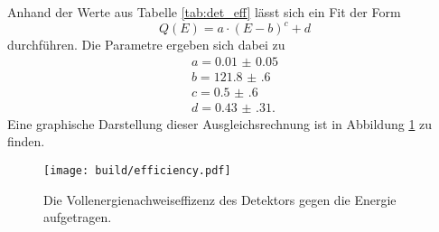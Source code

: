 Anhand der Werte aus Tabelle \ref{tab:det_eff} lässt sich ein Fit der Form
\begin{equation}
  Q(E) = a \cdot \left(E-b \right)^c + d
\end{equation}
durchführen. Die Parametre ergeben sich dabei zu
\begin{gather}
  a = \num{0.01(5)} \\
  b = \num{121.8(6)} \\
  c = \num{0.5(6)} \\
  d = \num{0.43(31)}.
\end{gather}
Eine graphische Darstellung dieser Ausgleichsrechnung ist in Abbildung \ref{fig:effizenz} zu finden.

\begin{figure}[htb]
 \centering
 \texttt{[image: build/efficiency.pdf]}
 \caption{Die Vollenergienachweiseffizenz des Detektors gegen die Energie aufgetragen.}
 \label{fig:effizenz}
\end{figure}



\FloatBarrier


